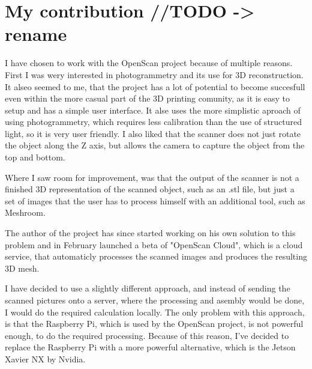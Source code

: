\chapter{My contribution //TODO -> rename}
\label{sec:contribution}
I have chosen to work with the OpenScan project because of multiple reasons.
First I was wery interested in photogrammetry and its use for 3D reconstruction.
It alseo seemed to me, that the project has a lot of potential to become succesfull even within the more casual part of the 3D printing comunity, as it is easy to setup and has a simple user interface.
It alse uses the more simplistic aproach of using photogrammetry, which requires less calibration than the use of structured light, so it is very user friendly.
I also liked that the scanner does not just rotate the object along the Z axis, but allows the camera to capture the object from the top and bottom.

Where I saw room for improvement, was that the output of the scanner is not a finished 3D representation of the scanned object, such as an .stl file, but just a set of images that the user has to process himself with an additional tool, such as Meshroom.

The author of the project has since started working on his own solution to this problem and in February launched a beta of "OpenScan Cloud", which is a cloud service, that automaticly processes the scanned images and produces the resulting 3D mesh.

I have decided to use a slightly different approach, and instead of sending the scanned pictures onto a server, where the processing and asembly would be done, I would do the required calculation locally.
The only problem with this approach, is that the Raspberry Pi, which is used by the OpenScan project, is not powerful enough, to do the required processing.
Because of this reason, I've decided to replace the Raspberry Pi with a more powerful alternative, which is the Jetson Xavier NX by Nvidia.

\endinput